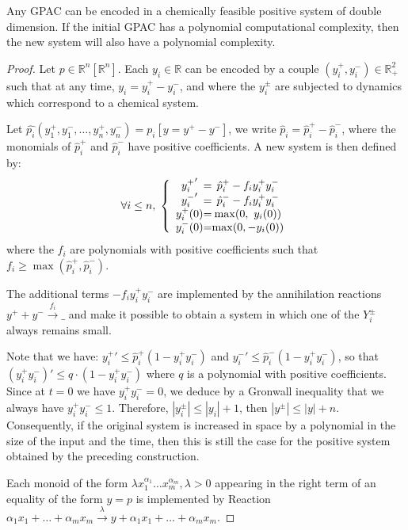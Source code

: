 \documentclass[graybox]{svmult}
\begin{document}
\begin{theorem} \label{positive}
Any GPAC can be encoded in a chemically feasible positive system of double dimension. If the initial GPAC has a polynomial computational complexity, then the new system will also have a polynomial complexity.
\end{theorem}
\begin{proof}
Let $ p \in \mathbb{R} ^ n [\mathbb{R} ^ n] $.
Each $ y_i \in \mathbb{R} $ can be encoded by a couple $ (y_i ^ +, y_i ^ -) \in \mathbb{R} _ + ^ 2 $ such that at any time, $y_i = y_i^+ - y_i^-$, and where the $ y_i ^{\pm} $
are subjected to dynamics which correspond to a chemical system.

Let $\hat{p_i}(y_1^+, y_1^-, \ldots, y_n^+, y_n^-) = p_i[y = y^+ - y^-]$, we write $\hat{p}_i = \hat{p}_i^+ - \hat{p}_i^-$,
  where the monomials of $ \hat{p} _i ^ + $ and $ \hat{p} _i ^ - $ have positive coefficients. A new system is then defined by:
\[
\forall i \leq n, \; \left \{
\begin{array}{c @{=} c}
{y_i ^ +} '& \hat{p} _i ^{+} - f_i y_i ^ + y_i ^ - \\
{y_i ^ -} '& \hat{p} _i ^{-} - f_i y_i ^ + y_i ^ - \\
y_i ^ + (0) & \max (0, ~y_i (0)) \\
y_i ^ - (0) & \max (0, -y_i (0))
\end{array}
\right.
\]
where the $ f_i $ are polynomials with positive coefficients such that $ f_i \geq \max (\hat{p} _i ^{+}, \hat{p} _i ^{-}) $.

The additional terms $ -f_i y_i ^ + y_i ^ - $ are implemented by the annihilation reactions $ y ^ + + y ^ - \xrightarrow{f_i} \_ $ and make it possible to obtain a system in which one of the $ Y_i ^{\pm} $ always remains small.

Note that we have: ${y_i ^ +}'\leq \hat{p} _i ^{+} (1 - y_i ^ + y_i ^ -) $ and ${y_i^-}' \leq \hat{p}_i^{-}(1 - y_i^+ y_i^-)$, so that
$(y_i^+ y_i^-)' \leq q \cdot (1 - y_i^+ y_i^-)$ where $q$  is a polynomial with positive coefficients. Since at $ t = 0 $ we have $ y_i ^ + y_i ^ - = 0 $, we deduce by a Gronwall inequality that we always have $ y_i ^ + y_i ^ - \leq 1 $. Therefore, $ | y_i ^{\pm} | \leq | y_i | + 1 $, then $ | y ^{\pm} | \leq | y | + n $. Consequently, if the original system is increased in space by a polynomial in the size of the input and the time, then this is still the case for the positive system obtained by the preceding construction.

Each monoid of the form $ \lambda x_1 ^{\alpha_1} \ldots x_m ^{\alpha_m}, \lambda> 0 $ appearing in the right term of an equality of the form $ y = p $ is implemented by Reaction $ \alpha_1 x_1 + \ldots + \alpha_m x_m \xrightarrow{\lambda} y + \alpha_1 x_1 + \ldots + \alpha_m x_m $.
\end{proof}
\end{document}
